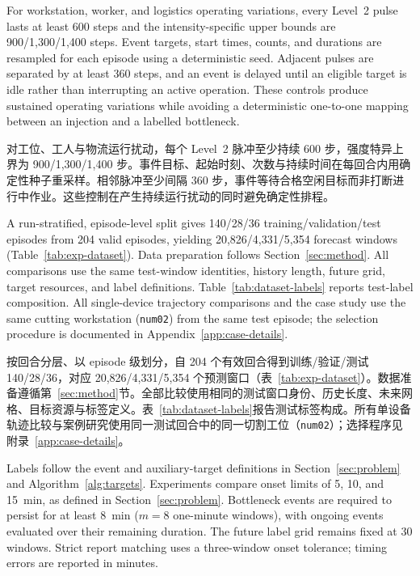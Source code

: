 \documentclass[a4paper,fleqn]{cas-dc}
\newcommand{\zhpara}[1]{%
  \par\begingroup\small\color{black!72}\noindent #1\par\endgroup}
\begin{document}
For workstation, worker, and logistics operating variations, every Level~2 pulse lasts at least 600 steps and the intensity-specific upper bounds are 900/1,300/1,400 steps. Event targets, start times, counts, and durations are resampled for each episode using a deterministic seed. Adjacent pulses are separated by at least 360 steps, and an event is delayed until an eligible target is idle rather than interrupting an active operation. These controls produce sustained operating variations while avoiding a deterministic one-to-one mapping between an injection and a labelled bottleneck.

\zhpara{对工位、工人与物流运行扰动，每个 Level~2 脉冲至少持续 600 步，强度特异上界为 900/1{,}300/1{,}400 步。事件目标、起始时刻、次数与持续时间在每回合内用确定性种子重采样。相邻脉冲至少间隔 360 步，事件等待合格空闲目标而非打断进行中作业。这些控制在产生持续运行扰动的同时避免确定性排程。}




A run-stratified, episode-level split gives 140/28/36 training/validation/test episodes from 204 valid episodes, yielding 20,826/4,331/5,354 forecast windows (Table~\ref{tab:exp-dataset}). Data preparation follows Section~\ref{sec:method}. All comparisons use the same test-window identities, history length, future grid, target resources, and label definitions. Table~\ref{tab:dataset-labels} reports test-label composition. All single-device trajectory comparisons and the case study use the same cutting workstation (\texttt{num02}) from the same test episode; the selection procedure is documented in Appendix~\ref{app:case-details}.

\zhpara{按回合分层、以 episode 级划分，自 204 个有效回合得到训练/验证/测试 140/28/36，对应 20{,}826/4{,}331/5{,}354 个预测窗口（表~\ref{tab:exp-dataset}）。数据准备遵循第~\ref{sec:method}节。全部比较使用相同的测试窗口身份、历史长度、未来网格、目标资源与标签定义。表~\ref{tab:dataset-labels}报告测试标签构成。所有单设备轨迹比较与案例研究使用同一测试回合中的同一切割工位（\texttt{num02}）；选择程序见附录~\ref{app:case-details}。}




Labels follow the event and auxiliary-target definitions in Section~\ref{sec:problem} and Algorithm~\ref{alg:targets}. Experiments compare onset limits of 5, 10, and 15~min, as defined in Section~\ref{sec:problem}. Bottleneck events are required to persist for at least 8~min ($m=8$ one-minute windows), with ongoing events evaluated over their remaining duration. The future label grid remains fixed at 30 windows. Strict report matching uses a three-window onset tolerance; timing errors are reported in minutes.
\end{document}
